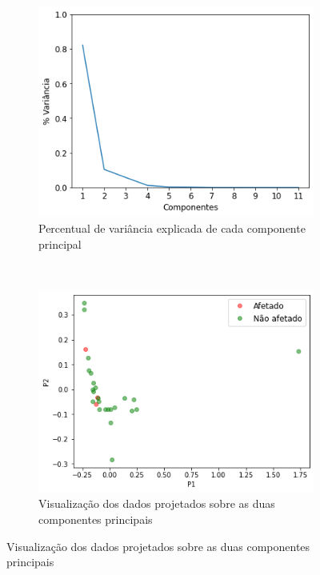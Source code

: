 \begin{figure}[htb] 
    \centering 
    \caption{PCA sobre dados mensais de UFs}
    \label{fig:resultados:base-de-dados-24-pca-monthly-uf} 
    \begin{subfigure}[b]{0.45\textwidth}
        \includegraphics[scale=0.45]{images/base-de-dados-24.1-pca-components-monthly-uf.png}
        \caption{Percentual de variância explicada de cada componente principal}
        \label{fig:resultados:base-de-dados-24.1-pca-components-monthly-uf}
    \end{subfigure} ~ \quad
    \begin{subfigure}[b]{0.45\textwidth}
        \includegraphics[scale=0.45]{images/base-de-dados-24.2-pca-2d-monthly-uf.png}
        \caption{Visualização dos dados projetados sobre as duas componentes principais}
        \label{fig:resultados:base-de-dados-24.2-pca-2d-monthly-uf}
    \end{subfigure}
    \fdadospesquisa
\end{figure}


